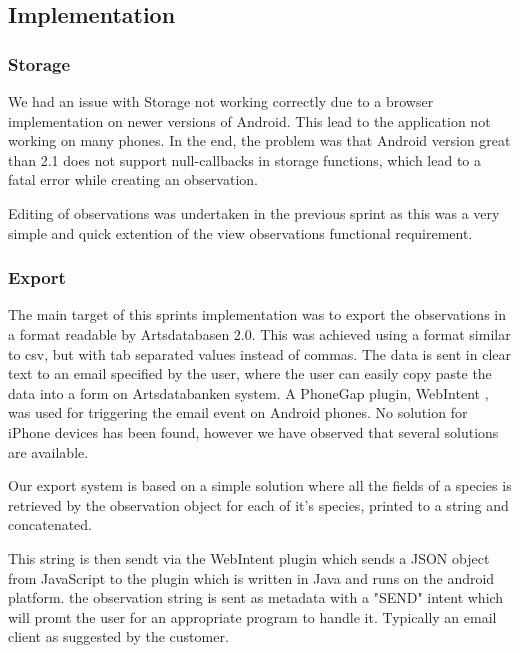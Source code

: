 \subsection{Implementation}

\subsubsection{Storage}

\label{sprint3:storage}

We had an issue with Storage not working correctly due to a browser
implementation on newer versions of Android. This lead to the application
not working on many  phones. In the end, the problem was that Android
version great than 2.1 does not support null-callbacks in storage functions, which
lead to a fatal error while creating an observation.

Editing of observations was undertaken in the previous sprint as this was a very simple and quick extention of the
view observations functional requirement.

	\subsubsection{Export}

	The main target of this sprints implementation was to export the
	observations in a format readable by Artsdatabasen 2.0. This was achieved
	using a format similar to csv, but with tab separated values instead of
	commas. The data is sent in clear text to an email specified by the user,
	where the user can easily copy paste the data into a form on Artsdatabanken
	system. A PhoneGap plugin, WebIntent \cite{library:webintent}, was used for triggering the email
	event on Android phones. No solution for iPhone devices has been found,
	however we have observed that several solutions are available.
	
	Our export system is based on a simple solution where all the fields of a species
	is retrieved by the observation object for each of it's species, printed to a string
	and concatenated.
	
	This string is then sendt via the WebIntent plugin which sends a JSON object from
	JavaScript to the plugin which is written in Java and runs on the android platform.
	the observation string is sent as metadata with a "SEND" intent which will promt 
	the user for an appropriate program to handle it. Typically an email client as
	suggested by the customer.

